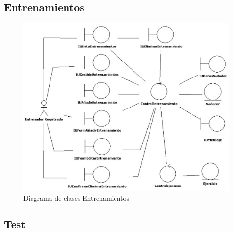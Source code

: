		\subsection{Entrenamientos} %
			\label{sub:entrenamientos}
			
			\begin{figure}[H]
			  \centering
			    \includegraphics[width=14cm]{./eps/an_diagclases/GestionEntrenamientos.eps}
			  \caption{Diagrama de clases Entrenamientos}
			  \label{fig:an_diagclases_entrenamientos}
			\end{figure}
		
		\subsection{Test} %
			\label{sub:test}
			
